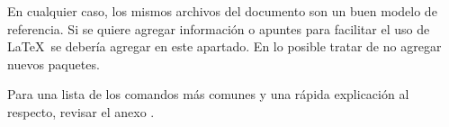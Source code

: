 En cualquier caso, los mismos archivos  del documento son un buen modelo de referencia. Si se quiere agregar información o apuntes para facilitar el uso de \LaTeX\ se debería agregar en este apartado. En lo posible tratar de no agregar nuevos paquetes.

Para una lista de los comandos más comunes y una rápida explicación al respecto, revisar el anexo .
